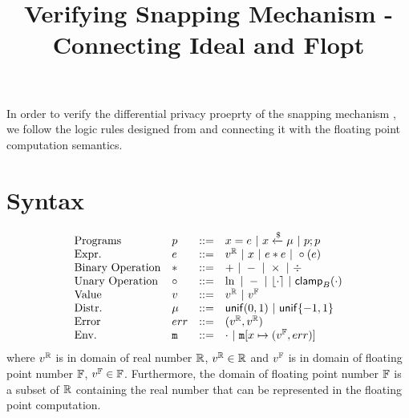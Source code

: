 \documentclass[a4paper,11pt]{article}
\begin{document}
\title{Verifying Snapping Mechanism - Connecting Ideal and Flopt}
\author{}

\date{}

\maketitle
In order to verify the differential privacy proeprty of
the snapping mechanism \cite{mironov2012significance},
we follow the logic rules designed from
\cite{barthe2016proving} and connecting 
it with the floating point computation semantics.
\section{Syntax}
\[\begin{array}{llll}
\mbox{Programs} & \prog & ::= & 
     \varx = \expr ~|~ \varx \samplel \edistr
	~|~ \prog ; \prog \\

\mbox{Expr.} & \expr & ::= & \rval 
	~|~ \varx  ~|~ \expr \bop \expr
	~|~ \uop (\expr) \\
%
\mbox{Binary Operation} & \bop & ::= & + ~|~ - ~|~ \times ~|~ \div \\
%
\mbox{Unary Operation} & \uop & ::= & \ln ~|~ - ~|~ \round{\cdot} 
	~|~ \clamp_B(\cdot) \\
%
\mbox{Value} & \valv & ::= & \rval ~|~  \fval \\
%
\mbox{Distr.} & \edistr & ::= & \uniform(0, 1) 
%
	~|~ \uniform\{-1, 1\}\\ 
%
\mbox{Error} & \err & ::= & (\rval, \rval) \\
%
\mbox{Env.} & \trsmem & ::= & \cdot ~|~ \trsmem[x \mapsto (\fval, \err)] 
\end{array}
\]
where $v^{\mathbb{R}}$ is in domain of real number $\mathbb{R}$, $v^{\mathbb{R}} \in \mathbb{R}$ and $v^{\mathbb{F}}$ is in domain of floating point number $\mathbb{F}$, $v^{\mathbb{F}} \in \mathbb{F}$. Furthermore, the domain of floating point number $\mathbb{F}$ is a subset of $\mathbb{R}$ containing the real number that can be represented in the floating point computation.


%
\end{document}
